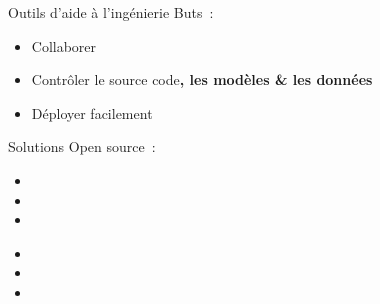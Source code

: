 \begin{frame}{Outils d'aide à l'ingénierie}
  Buts~:
  \begin{itemize}[<+->]
    \item Collaborer
    \item Contrôler le source code\textbf{, les modèles \& les données}
    \item Déployer facilement
  \end{itemize}
\end{frame}

\begin{frame}{Solutions}
  Open source~:
  \begin{itemize}[<+->]
    \item {}
    \item {}
    \item {}
  \end{itemize}

  \begin{itemize}[<+->]
    \item {}
    \item {}
    \item {}
  \end{itemize}
\end{frame}
